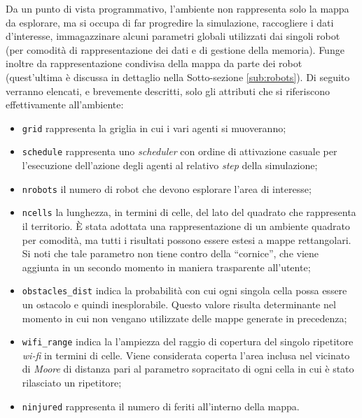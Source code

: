 Da un punto di vista programmativo, l'ambiente non rappresenta solo la mappa da esplorare, ma si occupa di far progredire la simulazione, raccogliere i dati d'interesse, immagazzinare alcuni parametri globali utilizzati dai singoli robot (per comodità di rappresentazione dei dati e di gestione della memoria). Funge inoltre da rappresentazione condivisa della mappa da parte dei robot (quest'ultima è discussa in dettaglio nella Sotto-sezione \ref{sub:robots}).
Di seguito verranno elencati, e brevemente descritti, solo gli attributi che si riferiscono effettivamente all'ambiente:
\begin{itemize}
	\item \texttt{grid} rappresenta la griglia in cui i vari agenti si muoveranno;
	\item \texttt{schedule} rappresenta uno \textit{scheduler} con ordine di attivazione casuale per l'esecuzione dell'azione degli agenti al relativo \textit{step} della simulazione;
	\item \texttt{nrobots} il numero di robot che devono esplorare l'area di interesse;
	\item \texttt{ncells} la lunghezza, in termini di celle, del lato del quadrato che rappresenta il territorio. È stata adottata una rappresentazione di un ambiente quadrato per comodità, ma tutti i risultati possono essere estesi a mappe rettangolari. Si noti che tale parametro non tiene contro della “cornice”, che viene aggiunta in un secondo momento in maniera trasparente all'utente;
	\item \texttt{obstacles\_dist} indica la probabilità con cui ogni singola cella possa essere un ostacolo e quindi inesplorabile. Questo valore risulta determinante nel momento in cui non vengano utilizzate delle mappe generate in precedenza;
	\item \texttt{wifi\_range} indica la l'ampiezza del raggio di copertura del singolo ripetitore \textit{wi-fi} in termini di celle. Viene considerata coperta l'area inclusa nel vicinato di \textit{Moore} di distanza pari al parametro sopracitato di ogni cella in cui è stato rilasciato un ripetitore;
	\item \texttt{ninjured} rappresenta il numero di feriti all'interno della mappa.
\end{itemize}

